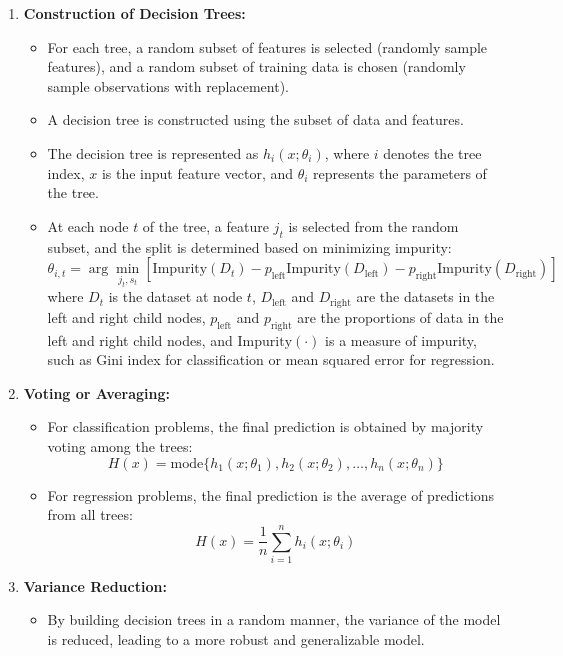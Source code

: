 \documentclass[12pt]{article}
\begin{document}
\begin{enumerate}
    \item \textbf{Construction of Decision Trees:}
        \begin{itemize}
            \item For each tree, a random subset of features is selected (randomly sample features), and a random subset of training data is chosen (randomly sample observations with replacement).
            \item A decision tree is constructed using the subset of data and features.
            \item The decision tree is represented as \(h_i(x;\theta_i)\), where \(i\) denotes the tree index, \(x\) is the input feature vector, and \(\theta_i\) represents the parameters of the tree.
            \item At each node \(t\) of the tree, a feature \(j_t\) is selected from the random subset, and the split is determined based on minimizing impurity:
            \[
            \theta_{i,t} = \arg\min_{j_t, s_t} \left[\textrm{Impurity}(D_t) - p_{\textrm{left}}\textrm{Impurity}(D_{\textrm{left}}) - p_{\textrm{right}}\textrm{Impurity}(D_{\textrm{right}})\right]
            \]
            where \(D_t\) is the dataset at node \(t\), \(D_{\textrm{left}}\) and \(D_{\textrm{right}}\) are the datasets in the left and right child nodes, \(p_{\textrm{left}}\) and \(p_{\textrm{right}}\) are the proportions of data in the left and right child nodes, and \(\textrm{Impurity}(\cdot)\) is a measure of impurity, such as Gini index for classification or mean squared error for regression.
        \end{itemize}
    
    \item \textbf{Voting or Averaging:}
        \begin{itemize}
            \item For classification problems, the final prediction is obtained by majority voting among the trees:
            \[
            H(x) = \textrm{mode}\{h_1(x;\theta_1), h_2(x;\theta_2), \ldots, h_n(x;\theta_n)\}
            \]
            \item For regression problems, the final prediction is the average of predictions from all trees:
            \[
            H(x) = \frac{1}{n}\sum_{i=1}^{n}h_i(x;\theta_i)
            \]
        \end{itemize}
    
    \item \textbf{Variance Reduction:}
        \begin{itemize}
            \item By building decision trees in a random manner, the variance of the model is reduced, leading to a more robust and generalizable model.
        \end{itemize}
\end{enumerate}
\end{document}
